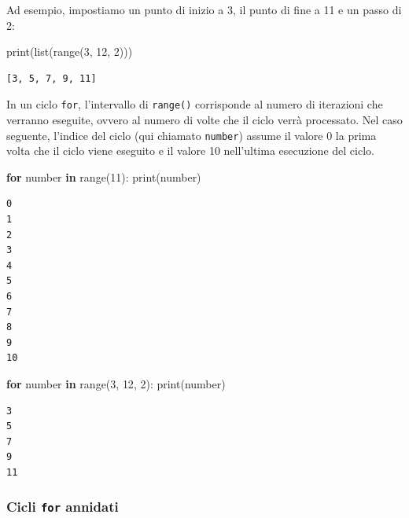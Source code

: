 \documentclass[
  letterpaper,
  krantz2]{{[}./krantz{]}}
\newenvironment{Shaded}{\begin{snugshade}}{\end{snugshade}}
\newcommand{\BuiltInTok}[1]{\textcolor[rgb]{0.00,0.23,0.31}{#1}}
\newcommand{\ControlFlowTok}[1]{\textcolor[rgb]{0.00,0.23,0.31}{\textbf{#1}}}
\newcommand{\DecValTok}[1]{\textcolor[rgb]{0.68,0.00,0.00}{#1}}
\newcommand{\KeywordTok}[1]{\textcolor[rgb]{0.00,0.23,0.31}{\textbf{#1}}}
\newcommand{\NormalTok}[1]{\textcolor[rgb]{0.00,0.23,0.31}{#1}}
\begin{document}
Ad esempio, impostiamo un punto di inizio a 3, il punto di fine a 11 e
un passo di 2:

\begin{Shaded}
\begin{Highlighting}[]
\BuiltInTok{print}\NormalTok{(}\BuiltInTok{list}\NormalTok{(}\BuiltInTok{range}\NormalTok{(}\DecValTok{3}\NormalTok{, }\DecValTok{12}\NormalTok{, }\DecValTok{2}\NormalTok{)))}
\end{Highlighting}
\end{Shaded}

\begin{verbatim}
[3, 5, 7, 9, 11]
\end{verbatim}

In un ciclo \texttt{for}, l'intervallo di \texttt{range()} corrisponde
al numero di iterazioni che verranno eseguite, ovvero al numero di volte
che il ciclo verrà processato. Nel caso seguente, l'indice del ciclo
(qui chiamato \texttt{number}) assume il valore 0 la prima volta che il
ciclo viene eseguito e il valore 10 nell'ultima esecuzione del ciclo.

\begin{Shaded}
\begin{Highlighting}[]
\ControlFlowTok{for}\NormalTok{ number }\KeywordTok{in} \BuiltInTok{range}\NormalTok{(}\DecValTok{11}\NormalTok{):}
    \BuiltInTok{print}\NormalTok{(number)}
\end{Highlighting}
\end{Shaded}

\begin{verbatim}
0
1
2
3
4
5
6
7
8
9
10
\end{verbatim}

\begin{Shaded}
\begin{Highlighting}[]
\ControlFlowTok{for}\NormalTok{ number }\KeywordTok{in} \BuiltInTok{range}\NormalTok{(}\DecValTok{3}\NormalTok{, }\DecValTok{12}\NormalTok{, }\DecValTok{2}\NormalTok{):}
    \BuiltInTok{print}\NormalTok{(number)}
\end{Highlighting}
\end{Shaded}

\begin{verbatim}
3
5
7
9
11
\end{verbatim}

\subsubsection{\texorpdfstring{Cicli \texttt{for}
annidati}{Cicli for annidati}}\label{cicli-for-annidati}
\end{document}
